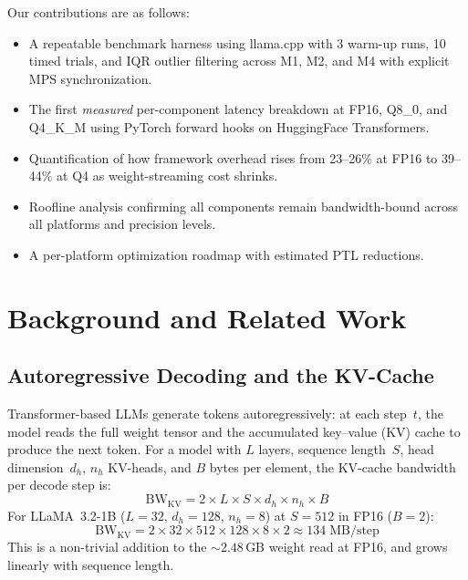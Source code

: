 \documentclass[conference]{IEEEtran}
\begin{document}
Our contributions are as follows:
\begin{itemize}
  \item A repeatable benchmark harness using llama.cpp with 3 warm-up runs, 10 timed trials, and IQR outlier filtering across M1, M2, and M4 with explicit MPS synchronization.
  \item The first \emph{measured} per-component latency breakdown at FP16, Q8\_0, and Q4\_K\_M using PyTorch forward hooks on HuggingFace Transformers.
  \item Quantification of how framework overhead rises from 23--26\% at FP16 to 39--44\% at Q4 as weight-streaming cost shrinks.
  \item Roofline analysis confirming all components remain bandwidth-bound across all platforms and precision levels.
  \item A per-platform optimization roadmap with estimated PTL reductions.
\end{itemize}

\section{Background and Related Work}

\subsection{Autoregressive Decoding and the KV-Cache}

Transformer-based LLMs generate tokens autoregressively: at each step~$t$, the model reads the full weight tensor and the accumulated key--value (KV) cache to produce the next token. For a model with $L$ layers, sequence length~$S$, head dimension~$d_h$, $n_h$ KV-heads, and $B$ bytes per element, the KV-cache bandwidth per decode step is:
\begin{equation}
  \text{BW}_{\text{KV}} = 2 \times L \times S \times d_h \times n_h \times B
  \label{eq:kv_bw}
\end{equation}
For LLaMA~3.2-1B ($L{=}32$, $d_h{=}128$, $n_h{=}8$) at $S{=}512$ in FP16 ($B{=}2$):
\begin{equation}
  \text{BW}_{\text{KV}} = 2 \times 32 \times 512 \times 128 \times 8 \times 2 \approx 134\;\text{MB/step}
\end{equation}
This is a non-trivial addition to the ${\sim}2.48$\,GB weight read at FP16, and grows linearly with sequence length.
\end{document}
